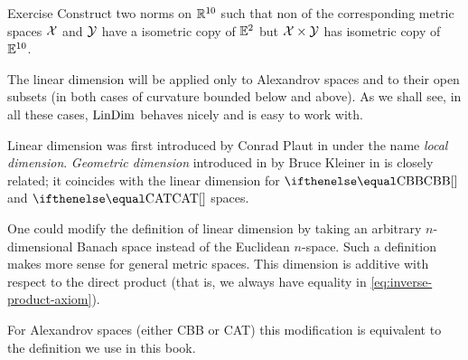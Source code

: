 \begin{thm}{Exercise}\label{ex:schroeder-foetch}
Construct two norms on $\mathbb{R}^{10}$ such that 
non of the corresponding metric spaces $\mathcal{X}$ and $\mathcal{Y}$
have a isometric copy of $\mathbb{E}^2$ but
$\spc{X}\times\spc{Y}$ has isometric copy of $\mathbb{E}^{10}$.
\end{thm}

The linear dimension will be applied only to  Alexandrov spaces and to their open subsets (in both cases of curvature bounded below and above).
As we shall see, in all these cases, $\mathop{\rm LinDim}\nolimits$  behaves nicely and  is easy to work with.

Linear dimension was first introduced by Conrad Plaut in \cite{plaut:survey}
under the name \emph{local dimension}. 
\emph{Geometric dimension} introduced in by Bruce Kleiner in \cite{kleiner} is closely related; 
it coincides %
 with the linear dimension for $\Alex{}$ and $\CAT{}$ spaces.

One could modify the definition of linear dimension by taking an arbitrary $n$-dimensional Banach space instead of the Euclidean $n$-space.
Such a definition makes more sense for general metric spaces.
This dimension is additive with respect to the direct product (that is, we always have equality in \ref{eq:inverse-product-axiom}). 

For Alexandrov spaces (either CBB or CAT) this modification is equivalent to the definition we use in this book.

